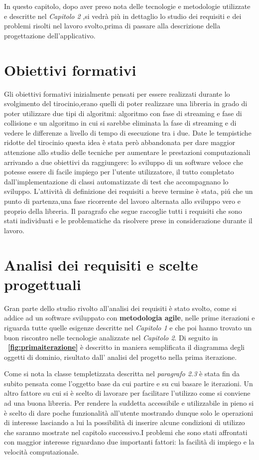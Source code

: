 In questo capitolo, dopo aver preso nota delle tecnologie e metodologie utilizzate e descritte nel \textit{Capitolo 2} ,si vedr\`a pi\`u in dettaglio lo studio dei requisiti e dei problemi risolti nel lavoro svolto,prima di passare alla descrizione della progettazione dell'applicativo.

\section{Obiettivi formativi}
Gli obiettivi formativi inizialmente pensati per essere realizzati durante lo svolgimento del tirocinio,erano quelli di poter realizzare una libreria in grado di poter utilizzare due tipi di algoritmi: algoritmo con fase di streaming e fase di collisione e un algoritmo in cui si sarebbe eliminata la fase di streaming e di vedere le differenze a livello di tempo di esecuzione tra i due. Date le tempistiche ridotte del tirocinio questa idea \`e stata per\`o abbandonata per dare maggior attenzione allo studio delle tecniche per aumentare le prestazioni computazionali arrivando a due obiettivi da raggiungere: lo sviluppo di un software veloce che potesse essere di facile impiego per l'utente utilizzatore, il tutto completato dall'implementazione di classi automatizzate di test che accompagnano lo sviluppo. L’attivit\`a di definizione dei requisiti a breve termine \`e stata, pi\'u che un punto di partenza,una fase ricorrente del lavoro alternata allo sviluppo vero e proprio della libreria. Il paragrafo che segue raccoglie tutti i requisiti che sono stati individuati e le problematiche da risolvere prese in considerazione durante il lavoro.

\section{Analisi dei requisiti e scelte progettuali}

Gran parte dello studio rivolto all'analisi dei requisiti \`e stato svolto, come si addice ad un software sviluppato con \textbf{metodologia agile}, nelle prime iterazioni e riguarda tutte quelle esigenze descritte nel \textit{Capitolo 1} e che poi hanno trovato un buon riscontro nelle tecnologie analizzate nel \textit{Capitolo 2}. Di seguito in \textbf{\figurename~\ref{fig:primaiterazione}}
\`e descritto in maniera semplificata il diagramma degli oggetti di dominio, risultato dall' analisi del progetto nella prima iterazione.

Come si nota la classe templetizzata descritta nel \textit{paragrafo 2.3} \`e stata fin da subito pensata come l'oggetto base da cui partire e su cui basare le iterazioni. Un altro fattore su cui si \`e scelto di lavorare per facilitare l'utilizzo come si conviene ad una buona libreria. Per rendere la suddetta accessibile e utilizzabile in pieno si \`e scelto di dare poche funzionalit\`a all'utente mostrando dunque solo le operazioni di interesse lasciando a lui la possibilit\`a di inserire alcune condizioni di utilizzo che saranno mostrate nel capitolo successivo.I problemi che sono stati affrontati con maggior interesse riguardano due importanti fattori: la facilit\`a di impiego e la velocit\`a computazionale.

